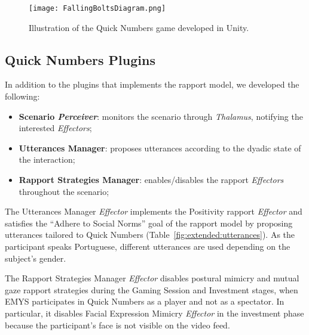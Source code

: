 \begin{figure}[H]
	\centering
	\texttt{[image: FallingBoltsDiagram.png]}
	\caption{Illustration of the Quick Numbers game developed in Unity.}
	\label{fig:quickNumbers}
\end{figure}

\subsection{Quick Numbers Plugins}

In addition to the plugins that implements the rapport model, we developed the following:
\begin{itemize}
	\item \textbf{Scenario \textit{Perceiver}}: monitors the scenario through \textit{Thalamus}, notifying the interested \textit{Effectors};
	\item \textbf{Utterances Manager}: proposes utterances according to the dyadic state of the interaction;
	\item \textbf{Rapport Strategies Manager}: enables/disables the rapport \textit{Effectors} throughout the scenario; 
\end{itemize}

The Utterances Manager \textit{Effector} implements the Positivity rapport \textit{Effector} and satisfies the ``Adhere to Social Norms'' goal of the rapport model by proposing utterances tailored to Quick Numbers (Table~\ref{fig:extended:utterances}). As the participant speaks Portuguese, different utterances are used depending on the subject's gender.

The Rapport Strategies Manager \textit{Effector} disables postural mimicry and mutual gaze rapport strategies during the Gaming Session and Investment stages, when \ac{EMYS} participates in Quick Numbers as a player and not as a spectator. In particular, it disables Facial Expression Mimicry \textit{Effector} in the investment phase because the participant's face is not visible on the video feed.


